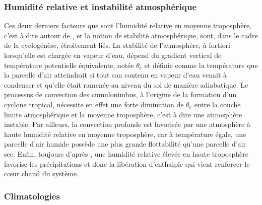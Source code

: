 \documentclass[../main.tex]{subfiles}
\begin{document}
\subsubsection*{Humidité relative et instabilité atmosphérique}

Ces deux derniers facteurs que sont l'humidité relative en moyenne troposphère, c'est à dire autour de , et la notion de stabilité atmosphérique, sont,
dans le cadre de la cyclogénèse, étroitement liés. La stabilité de l'atmosphère, à fortiori lorsqu'elle est chargée en vapeur d'eau, dépend du gradient vertical
de température potentielle équivalente, notée $\theta_e$ et définie comme la température que la parcelle d'air atteindrait si tout son contenu en vapeur d'eau
venait à condenser et qu'elle était ramenée au niveau du sol de manière adiabatique. Le processus de convection des cumulonimbus, à l'origine de la formation
d'un cyclone tropical, nécessite en effet une forte diminution de $\theta_e$ entre la couche limite atmosphérique et la moyenne troposphère, c'est à dire une
atmosphère instable. Par ailleurs, la convection profonde est favorisée par une atmosphère à haute humidité relative en moyenne troposphère, car à température
égale, une parcelle d'air humide possède une plus grande flottabilité qu'une parcelle d'air sec. Enfin, toujours d'après \cite{gray_tropical_1975}, une humidité
relative élevée en haute troposphère favorise les précipitations et donc la libération d'enthalpie qui vient renforcer le cœur chaud du système.

\subsubsection*{Climatologies}\label{sec:climato_ingredients}
\end{document}
